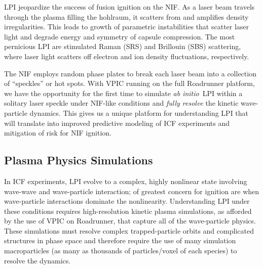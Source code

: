 \documentclass[10pt]{article}
\newcommand{\abinitio} {\textit{ab initio}}
\begin{document}
LPI jeopardize the success of fusion ignition on the NIF.  As a laser
beam travels through the plasma filling the hohlraum, it scatters from
and amplifies density irregularities.  This leads to growth of
parametric instabilities that scatter laser light and degrade energy
and symmetry of capsule compression.  The most pernicious LPI are
stimulated Raman (SRS) and Brillouin (SBS) scattering, where laser
light scatters off electron and ion density fluctuations,
respectively.

The NIF employs random phase plates to break each laser beam into a
collection of ``speckles'' or hot spots.  
With VPIC running on the full
Roadrunner platform, we have the opportunity for the first time to
simulate \abinitio\ LPI within a solitary laser speckle under NIF-like
conditions and \textit{fully resolve} the kinetic wave-particle
dynamics.  This gives us a unique platform for understanding LPI that
will translate into improved predictive modeling of ICF experiments
and mitigation of risk for NIF ignition.

\subsection{Plasma Physics Simulations}

In ICF experiments, LPI evolve to a complex, highly nonlinear state
involving wave-wave and wave-particle interaction; of greatest concern
for ignition are when wave-particle interactions dominate the
nonlinearity.  Understanding LPI under these conditions requires
high-resolution kinetic plasma simulations, as afforded by the use of
VPIC on Roadrunner, that capture all of the wave-particle physics.
These simulations must resolve complex trapped-particle orbits and
complicated structures in phase space and therefore require the use of
many simulation macroparticles (as many as thousands of
particles/voxel of each species) to resolve the
dynamics.~\cite{Yin_et_al_Phys_Plasmas_2006}
\end{document}
